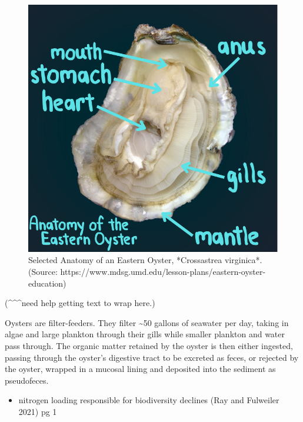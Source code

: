 \documentclass[
  11pt,
]{article}
\providecommand{\tightlist}{%
  \setlength{\itemsep}{0pt}\setlength{\parskip}{0pt}}
\begin{document}
\begin{figure}
  \vspace{-\baselineskip}
  \centering
    \includegraphics[width=\linewidth]{images/clipboard-2987364097.png}
  \caption{Selected Anatomy of an Eastern Oyster, *Crossastrea virginica*. (Source: https://www.mdsg.umd.edu/lesson-plans/eastern-oyster-education)}
  \vspace{-\baselineskip}
\end{figure}

(\^{}\^{}\^{}need help getting text to wrap here.)

Oysters are filter-feeders. They filter \textasciitilde50 gallons of
seawater per day, taking in algae and large plankton through their gills
while smaller plankton and water pass through. The organic matter
retained by the oyster is then either ingested, passing through the
oyster's digestive tract to be excreted as feces, or rejected by the
oyster, wrapped in a mucosal lining and deposited into the sediment as
pseudofeces.

\begin{itemize}
\tightlist
\item
  nitrogen loading responsible for biodiversity declines (Ray and
  Fulweiler 2021) pg 1
\end{itemize}
\end{document}
